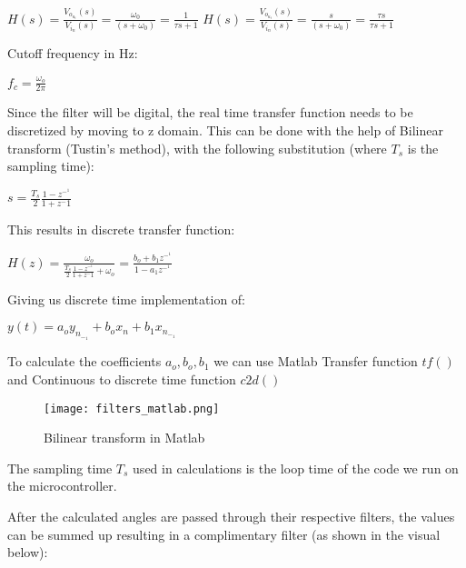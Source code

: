 \documentclass{article}
\begin{document}
\center $H(s) = \frac{V_o_u_t(s)}{V_i_n(s)} = \frac{\omega_0}{(s+\omega_0)}= \frac{1}{\tau s+1}$
\center $H(s) = \frac{V_o_u_t(s)}{V_i_n(s)} = \frac{s}{(s+\omega_0)}= \frac{\tau s}{\tau s+1}$

\begin{flushleft}
Cutoff frequency in Hz:
\end{flushleft}
$f_c=\frac{\omega _o}{2\pi}$
\newline
\begin{flushleft}
Since the filter will be digital, the real time transfer function needs to be discretized by moving to z domain. This can be done with the help of Bilinear transform (Tustin's method), with the following substitution (where $T_s$ is the sampling time):
\end{flushleft}
$s=\frac{T_s}{2}\frac{1-z^-^1}{1+z^-1}$

\begin{flushleft}
 This results in discrete transfer function: 
\end{flushleft}

$H(z)= \frac{\omega _o}{\frac{T_s}{2}\frac{1-z^-^1}{1+z^-1} + \omega _o}=\frac{b_o + b_1z^-^1}{1-a_1z^-^1}$

\begin{flushleft}
Giving us discrete time implementation of:  
\end{flushleft}
$y(t)=a_o y_n_-_1+b_ox_n+b_1x_n_-_1  $

\begin{flushleft}
To calculate the coefficients $a_o, b_o, b_1$ we can use Matlab Transfer function $tf()$ and Continuous to discrete time function $c2d() $
\end{flushleft}

\begin{figure}[H]
    \begin{center}
    \texttt{[image: filters\_matlab.png]}
    \end{center}
    \caption{Bilinear transform in Matlab}
    \label{fig:my_label}
\end{figure}


\begin{flushleft}
The sampling time $T_s$ used in calculations is the loop time of the code we run on the microcontroller.


After the calculated angles are passed through their respective filters, the values can be summed up resulting in a complimentary filter (as shown in the visual below):
\end{flushleft}
\end{document}
